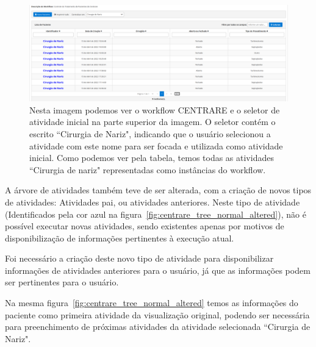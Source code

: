 \begin{figure}
    \centering
    \includegraphics[width=1\textwidth]{imgs/CENTRARE/instanciaAlterada.png}
    \caption{Nesta imagem podemos ver o workflow CENTRARE e o seletor de atividade inicial na parte superior da imagem. O seletor contém o escrito ``Cirurgia de Nariz", indicando que o usuário selecionou a atividade com este nome para ser focada e utilizada como atividade inicial. Como podemos ver pela tabela, temos todas as atividades ``Cirurgia de nariz" representadas como instâncias do workflow.}
    \label{fig:centrare_seletor_alterado}
\end{figure}

A árvore de atividades também teve de ser alterada, com a criação de novos tipos de atividades: Atividades pai, ou atividades anteriores. Neste tipo de atividade (Identificados pela cor azul na figura~\ref{fig:centrare_tree_normal_altered}), não é possível executar novas atividades, sendo existentes apenas por motivos de disponibilização de informações pertinentes à execução atual.

Foi necessário a criação deste novo tipo de atividade para disponibilizar informações de atividades anteriores para o usuário, já que as informações podem ser pertinentes para o usuário.

Na mesma figura~\ref{fig:centrare_tree_normal_altered} temos as informações do paciente como primeira atividade da visualização original, podendo ser necessária para preenchimento de próximas atividades da atividade selecionada ``Cirurgia de Nariz".

